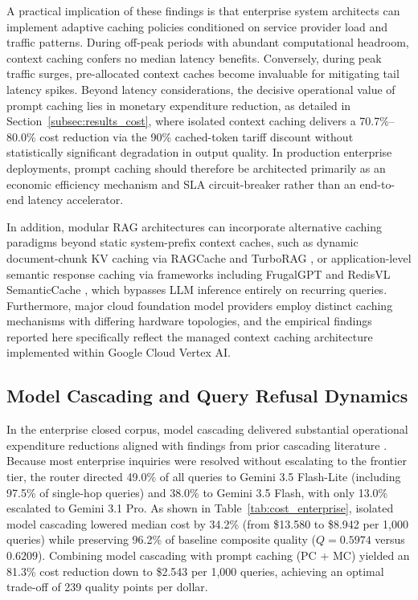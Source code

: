 A practical implication of these findings is that enterprise system architects can implement adaptive caching policies conditioned on service provider load and traffic patterns. During off-peak periods with abundant computational headroom, context caching confers no median latency benefits. Conversely, during peak traffic surges, pre-allocated context caches become invaluable for mitigating tail latency spikes. Beyond latency considerations, the decisive operational value of prompt caching lies in monetary expenditure reduction, as detailed in Section~\ref{subsec:results_cost}, where isolated context caching delivers a 70.7\%--80.0\% cost reduction via the 90\% cached-token tariff discount \citep{GoogleVertexAIPricing} without statistically significant degradation in output quality. In production enterprise deployments, prompt caching should therefore be architected primarily as an economic efficiency mechanism and SLA circuit-breaker rather than an end-to-end latency accelerator.

In addition, modular RAG architectures can incorporate alternative caching paradigms beyond static system-prefix context caches, such as dynamic document-chunk KV caching via RAGCache \citep{jin2025ragcache} and TurboRAG \citep{lu2025turborag}, or application-level semantic response caching via frameworks including FrugalGPT \citep{chen2023frugalgpt} and RedisVL SemanticCache \citep{RedisVLSemanticCache}, which bypasses LLM inference entirely on recurring queries. Furthermore, major cloud foundation model providers employ distinct caching mechanisms with differing hardware topologies, and the empirical findings reported here specifically reflect the managed context caching architecture implemented within Google Cloud Vertex AI.

\subsection{Model Cascading and Query Refusal Dynamics}
\label{subsec:disc_model_cascading}

In the enterprise closed corpus, model cascading delivered substantial operational expenditure reductions aligned with findings from prior cascading literature \citep{chen2023frugalgpt, ong2025routellm}. Because most enterprise inquiries were resolved without escalating to the frontier tier, the router directed 49.0\% of all queries to Gemini 3.5 Flash-Lite (including 97.5\% of single-hop queries) and 38.0\% to Gemini 3.5 Flash, with only 13.0\% escalated to Gemini 3.1 Pro. As shown in Table~\ref{tab:cost_enterprise}, isolated model cascading lowered median cost by 34.2\% (from \$13.580 to \$8.942 per 1,000 queries) while preserving 96.2\% of baseline composite quality ($Q = 0.5974$ versus $0.6209$). Combining model cascading with prompt caching (PC + MC) yielded an 81.3\% cost reduction down to \$2.543 per 1,000 queries, achieving an optimal trade-off of 239 quality points per dollar.

